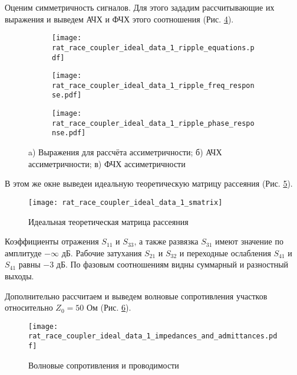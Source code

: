 Оценим симметричность сигналов. Для этого зададим рассчитывающие их выражения и выведем АЧХ и ФЧХ этого соотношения (Рис. \ref{fig:rat_race_coupler_ideal_data_1_ripple_responses}).

\begin{figure}[!ht]
    \centering
    \begin{subfigure}[b]{\textwidth}
        \centering
        \texttt{[image: rat\_race\_coupler\_ideal\_data\_1\_ripple\_equations.pdf]}
        \caption{}
        \label{fig:rat_race_coupler_ideal_ripple_equations}
    \end{subfigure}
    \vfill
    \begin{subfigure}[b]{0.45\textwidth}
        \centering
        \texttt{[image: rat\_race\_coupler\_ideal\_data\_1\_ripple\_freq\_response.pdf]}
        \caption{}
        \label{fig:rat_race_coupler_ideal_data_1_ripple_freq_response}
    \end{subfigure}
    \hfill
    \begin{subfigure}[b]{0.45\textwidth}
        \centering
        \texttt{[image: rat\_race\_coupler\_ideal\_data\_1\_ripple\_phase\_response.pdf]}
        \caption{}
        \label{fig:rat_race_coupler_ideal_data_1_ripple_phase_response}
    \end{subfigure}
    \caption{
        a) Выражения для рассчёта ассиметричности;
        б) АЧХ ассиметричности;
        в) ФЧХ ассиметричности
    }
    \label{fig:rat_race_coupler_ideal_data_1_ripple_responses}
\end{figure}

В этом же окне выведеи идеальную теоретическую матрицу рассеяния (Рис. \ref{fig:rat_race_coupler_ideal_data_1_smatrix}).
\begin{figure}[!ht]
    \centering
    \texttt{[image: rat\_race\_coupler\_ideal\_data\_1\_smatrix]}
    \caption{Идеальная теоретическая матрица рассеяния}
    \label{fig:rat_race_coupler_ideal_data_1_smatrix}
\end{figure}
Коэффициенты отражения $S_{11}$ и $S_{33}$, а также развязка $S_{31}$ имеют значение по амплитуде $-\infty \text{~дБ}$. Рабочие затухания $S_{21}$ и $S_{32}$ и переходные ослабления $S_{41}$ и $S_{41}$ равны $-3 \text{~дБ}$. По фазовым соотношениям видны суммарный и разностный выходы.

Дополнительно рассчитаем и выведем волновые сопротивления участков относительно $Z_0 = 50 \text{~Ом}$ (Рис. \ref{fig:rat_race_coupler_ideal_data_1_impedances_and_admittances}).
\begin{figure}[!ht]
    \centering
    \texttt{[image: rat\_race\_coupler\_ideal\_data\_1\_impedances\_and\_admittances.pdf]}
    \caption{Волновые сопротивления и проводимости}
    \label{fig:rat_race_coupler_ideal_data_1_impedances_and_admittances}
\end{figure}


